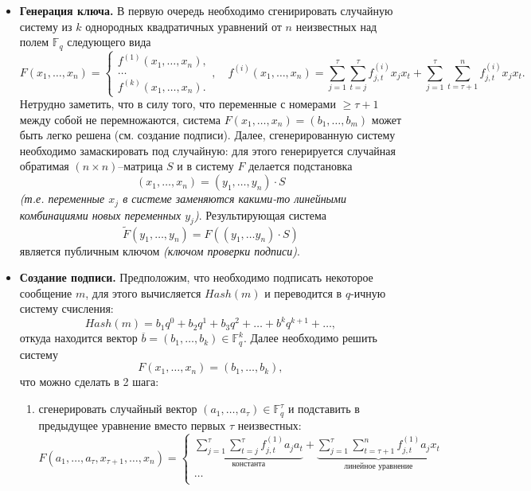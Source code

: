 \documentclass[12pt,letterpaper]{article}
\newcommand{\FF}{\mathds{F}}
\begin{document}
\begin{itemize}
  \item \textbf{Генерация ключа.} В первую очередь необходимо сгенирировать случайную систему из $k$ однородных квадратичных уравнений от $n$ неизвестных над полем $\FF_q$ следующего вида
  \[
    F(x_1, \dots, x_n) = \begin{cases}
      f^{(1)}(x_1, \dots, x_n), \\
      \dots \\
      f^{(k)}(x_1, \dots, x_n). 
    \end{cases}, \quad
    f^{(i)}(x_1, \dots, x_n) = \sum_{j = 1}^\tau \sum_{t = j}^\tau f^{(i)}_{j,t} x_j x_t + \sum_{j = 1}^\tau \sum_{t = \tau+1}^n f^{(i)}_{j,t} x_j x_t.
  \]
  Нетрудно заметить, что в силу того, что переменные с номерами $\geq \tau+1$ между собой не перемножаются, система $F(x_1, \dots, x_n) = (b_1, \dots, b_m)$ может быть  легко решена (см. создание подписи). Далее, сгенерированную систему необходимо замаскировать под случайную: для этого генерируется случайная обратимая $(n \times n)$--матрица $S$ и в систему $F$ делается подстановка
  \[ (x_1, \dots, x_n) = (y_1, \dots, y_n) \cdot S \]
  \emph{(т.е. переменные $x_j$ в системе заменяются какими-то линейными комбинациями новых переменных $y_j$)}. Результирующая система 
  \[ \tilde{F}(y_1, \dots, y_n) = F\left( (y_1, \dots y_n) \cdot S \right) \]
  является публичным ключом \emph{(ключом проверки подписи)}.
  \item \textbf{Создание подписи.} Предположим, что необходимо подписать некоторое сообщение $m$, для этого вычисляется $Hash(m)$ и переводится в $q$-ичную систему счисления:
  \[ Hash(m) = b_1 q^0 + b_2 q^1 + b_3 q^2 + \dots + b^k q^{k+1} + \dots, \]
  откуда находится вектор $\overline{b} = (b_1, \dots, b_k) \in \FF_q^k$. Далее необходимо решить систему
  \[ F(x_1, \dots, x_n) = (b_1, \dots, b_k), \]
  что можно сделать в 2 шага:
  \begin{enumerate}
    \item сгенерировать случайный вектор $(a_1, \dots, a_\tau) \in \FF_q^\tau$ и подставить в предыдущее уравнение вместо первых $\tau$ неизвестных:
    \[
      F(a_1, \dots, a_\tau, x_{\tau+1}, \dots, x_n) = 
      \begin{cases}
        \underbrace{\sum_{j = 1}^\tau \sum_{t = j}^\tau f^{(1)}_{j,t} a_j a_t }_{\text{константа}}  + \underbrace{\sum_{j = 1}^\tau \sum_{t = \tau+1}^n f^{(1)}_{j,t} a_j x_t}_{\text{линейное уравнение}} \\
        \dots \\

\end{cases}\]
\end{enumerate}
\end{itemize}
\end{document}
